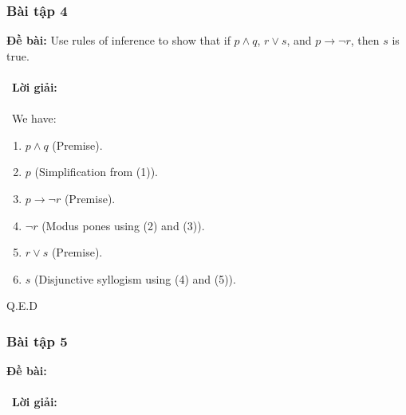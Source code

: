\documentclass[a4paper]{article}
\begin{document}
\subsubsection{Bài tập 4}
\textbf{Đề bài:} Use rules of inference to show that if $p \land q$, $r \lor s$, and $p \rightarrow \lnot r$, then $s$ is true. \\\ \\\
\textbf{Lời giải:} \\\ \\\
We have:
\begin{enumerate}
\item $p \land q$ (Premise).
\item $p$ (Simplification from (1)).
\item $p \rightarrow \lnot r$ (Premise).
\item $\lnot r$ (Modus pones using (2) and (3)).
\item $r \lor s$ (Premise).
\item $s$ (Disjunctive syllogism using (4) and (5)).
\end{enumerate}
Q.E.D

\clearpage
\subsubsection{Bài tập 5}
\textbf{Đề bài:} 
\\\ \\\
\textbf{Lời giải:} \\\ \\\
\clearpage
\end{document}
